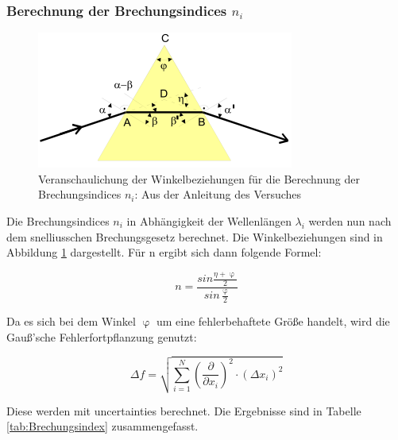 \subsubsection{Berechnung der Brechungsindices $n_i$}

\begin{figure}
  \centering
  \includegraphics[scale=0.6]{images/Brechungsindex.png}
  \caption{Veranschaulichung der Winkelbeziehungen für die Berechnung der Brechungsindices $n_i$: Aus der Anleitung des Versuches \cite[23]{1}}
  \label{fig:Brechungsindex}
\end{figure}

Die Brechungsindices $n_i$ in Abhängigkeit der Wellenlängen $\lambda_i$ werden nun nach dem snelliusschen Brechungsgesetz berechnet.
Die Winkelbeziehungen sind in Abbildung \ref{fig:Brechungsindex} dargestellt.
Für n ergibt sich dann folgende Formel:

\begin{equation}
  n = \frac{sin\frac{\eta + \upvarphi}{2}}{sin\frac{\upvarphi}{2}}
\end{equation}

Da es sich bei dem Winkel $\upvarphi$ um eine fehlerbehaftete Größe handelt, wird die Gauß'sche Fehlerfortpflanzung genutzt:

\begin{equation}
  \label{eqn:gauß}
  \Delta f = \sqrt{ \sum_{i=1}^N \left(\frac{\partial}{\partial x_i}\right)^2 \cdot \left(\Delta x_i\right)^2}
\end{equation}

Diese werden mit uncertainties berechnet.
Die Ergebnisse sind in Tabelle \ref{tab:Brechungsindex} zusammengefasst.

